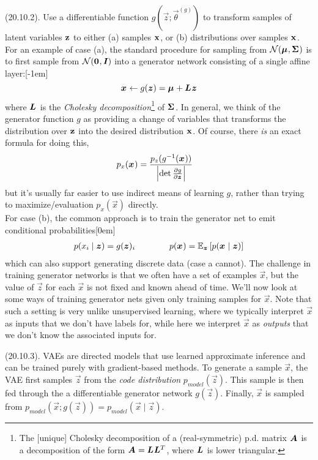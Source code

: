 \documentclass[11pt]{article}
\begin{document}
\myspace
\p {} (20.10.2). Use a differentiable function $g(\vec z; \vec{\theta}^{(g)})$ to transform samples of latent variables $\rvec z$ to either (a) samples $\rvec x$, or (b) distributions over samples $\rvec x$. For an example of case (a), the standard procedure for sampling from $\mathcal N(\vec\mu, \matr\Sigma)$ is to first sample from $\mathcal{N}(\vec 0, \matr I)$ into a generator network consisting of a single affine layer:[-1em]
$$
	\vec x \leftarrow g(\vec z) = \vec{\mu} + \matr L \vec z
$$
where $\matr L$ is the \textit{Cholesky decomposition}\footnote{The [unique] Cholesky decomposition of a (real-symmetric) p.d. matrix $\matr A$ is a decomposition of the form $\matr A = \matr L \matr L^T$, where $\matr L$ is lower triangular.} of $\matr\Sigma$. In general, we think of the generator function $g$ as providing a change of variables that transforms the distribution over $\rvec z$ into the desired distribution $\rvec x$. Of course, there \textit{is} an exact formula for doing this,
\begin{align}
	p_x(\vec x) 
		&= \frac{ p_z(g^{-1}(\vec x))  }{  \left|  \det \pderiv{g}{\vec z}  \right| }
\end{align}
but it's usually far easier to use indirect means of learning $g$, rather than trying to maximize/evaluation $p_x(\vec x)$ directly. \\

For case (b), the common approach is to train the generator net to emit conditional probabilities[0em]
\begin{align}
	p(x_i \mid \vec z) = g(\vec z)_i \qquad\qquad p(\vec x) = \E[\vec z]{p(\vec x \mid \vec z)}
\end{align}
which can also support generating discrete data (case a cannot). The challenge in training generator networks is that we often have a set of examples $\vec x$, but the value of $\vec z$ for each $\vec x$ is not fixed and known ahead of time. We'll now look at some ways of training generator nets given only training samples for $\vec x$. Note that such a setting is very unlike unsupervised learning, where we typically interpret $\vec x$ as inputs that we don't have labels for, while here we interpret $\vec x$ as \textit{outputs} that we don't know the associated inputs for. 

\myspace 
\p {} (20.10.3). VAEs are directed models that use learned approximate inference and can be trained purely with gradient-based methods. To generate a sample $\vec x$, the VAE first samples $\vec z$ from the \textit{code distribution} $p_{model}(\vec z)$. This sample is then fed through the a differentiable generator network $g(\vec z)$. Finally, $\vec x$ is sampled from $p_{model}(\vec x; g(\vec z)) = p_{model}(\vec x \mid \vec z)$.  
\end{document}
